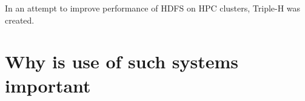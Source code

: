 \documentclass{report}
\begin{document}
	
	
	

	

	
	
	
    In an attempt to improve performance of HDFS on HPC clusters, Triple-H was
    created.  \section{Why is use of such systems important}
\end{document}
